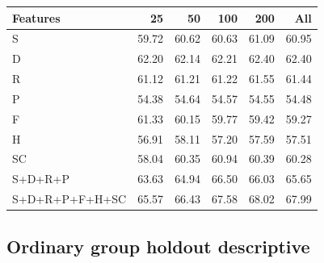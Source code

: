 \begin{center}\small

\begin{tabular}{lrrrrr}\toprule

Features & 25 & 50 & 100 & 200 & All \\ \midrule

S & 59.72 & 60.62 & 60.63 & 61.09 & 60.95 \\

D & 62.20 & 62.14 & 62.21 & 62.40 & 62.40 \\

R & 61.12 & 61.21 & 61.22 & 61.55 & 61.44 \\

P & 54.38 & 54.64 & 54.57 & 54.55 & 54.48 \\

F & 61.33 & 60.15 & 59.77 & 59.42 & 59.27 \\

H & 56.91 & 58.11 & 57.20 & 57.59 & 57.51 \\

SC & 58.04 & 60.35 & 60.94 & 60.39 & 60.28 \\

S+D+R+P & 63.63 & 64.94 & 66.50 & 66.03 & 65.65 \\

S+D+R+P+F+H+SC & 65.57 & 66.43 & 67.58 & 68.02 & 67.99 \\

\bottomrule\end{tabular}\end{center}

\clearpage
\subsection{Ordinary group holdout descriptive}

